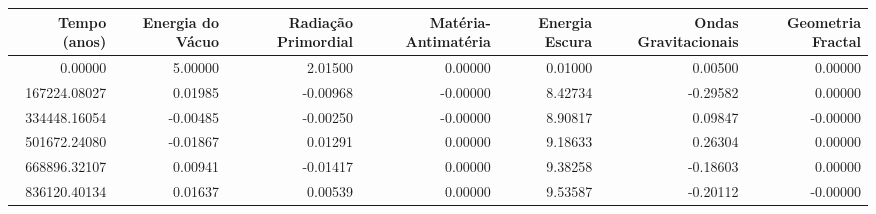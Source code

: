 \begin{tabular}{rrrrrrr}
\toprule
Tempo (anos) & Energia do Vácuo & Radiação Primordial & Matéria-Antimatéria & Energia Escura & Ondas Gravitacionais & Geometria Fractal \\
\midrule
0.00000 & 5.00000 & 2.01500 & 0.00000 & 0.01000 & 0.00500 & 0.00000 \\
167224.08027 & 0.01985 & -0.00968 & -0.00000 & 8.42734 & -0.29582 & 0.00000 \\
334448.16054 & -0.00485 & -0.00250 & -0.00000 & 8.90817 & 0.09847 & -0.00000 \\
501672.24080 & -0.01867 & 0.01291 & 0.00000 & 9.18633 & 0.26304 & 0.00000 \\
668896.32107 & 0.00941 & -0.01417 & 0.00000 & 9.38258 & -0.18603 & 0.00000 \\
836120.40134 & 0.01637 & 0.00539 & 0.00000 & 9.53587 & -0.20112 & -0.00000 \\
\bottomrule
\end{tabular}
